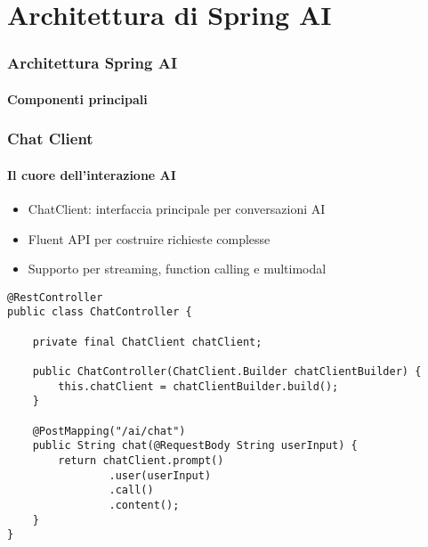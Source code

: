 \section{Architettura di Spring AI} %
\label{sec:spring_ai_architecture}
%
\begin{frame}[t,fragile] \frametitle{Architettura Spring AI}
    \framesubtitle{Componenti principali}
    \vspace*{-10pt}
\end{frame}
%
%
\begin{frame}[t,fragile] \frametitle{Chat Client}
	{\small
		\framesubtitle{Il cuore dell'interazione AI}
		\begin{itemize}[leftmargin=10pt,align=right]
			\onslide<2->\item[\alert{\faHandORight}] \alert{ChatClient:} interfaccia principale per conversazioni AI
			\onslide<3->\item[\alert{\faHandORight}] \alert{Fluent API} per costruire richieste complesse
			\onslide<4->\item[\alert{\faHandORight}] Supporto per \alert{streaming}, \alert{function calling} e \alert{multimodal}
		\end{itemize}
		\vspace*{.3cm}
\begin{verbatim}
@RestController
public class ChatController {
    
    private final ChatClient chatClient;
    
    public ChatController(ChatClient.Builder chatClientBuilder) {
        this.chatClient = chatClientBuilder.build();
    }
    
    @PostMapping("/ai/chat")
    public String chat(@RequestBody String userInput) {
        return chatClient.prompt()
                .user(userInput)
                .call()
                .content();
    }
}
\end{verbatim}
	}
\end{frame}
%
